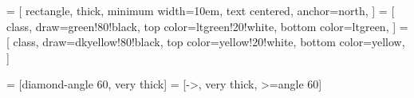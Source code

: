\newcommand{\umlclass}[2]{#1\\[2pt] \hrule \vspace*{4pt} \parbox{\textwidth}{#2}}
\newcommand{\umltype}[1]{$\ll$type$\gg$\\ #1}
\newcommand{\umlemptyclass}[1]{#1}

 = [
  rectangle,
  thick,
  minimum width=10em,
  text centered,
  anchor=north,
]
 = [
  class,
  draw=green!80!black,
  top color=ltgreen!20!white,
  bottom color=ltgreen,
]
 = [
  class,
  draw=dkyellow!80!black,
  top color=yellow!20!white,
  bottom color=yellow,
]

 = [diamond-angle 60, very thick]
 = [->, very thick, >=angle 60]


